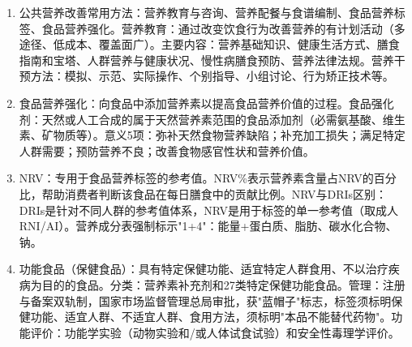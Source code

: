 {\begin{enumerate}[leftmargin=*, itemsep=5pt]
    \item 公共营养改善常用方法：营养教育与咨询、营养配餐与食谱编制、食品营养标签、食品营养强化。营养教育：通过改变饮食行为改善营养的有计划活动（多途径、低成本、覆盖面广）。主要内容：营养基础知识、健康生活方式、膳食指南和宝塔、人群营养与健康状况、慢性病膳食预防、营养法律法规。营养干预方法：模拟、示范、实际操作、个别指导、小组讨论、行为矫正技术等。

    \item 食品营养强化：向食品中添加营养素以提高食品营养价值的过程。食品强化剂：天然或人工合成的属于天然营养素范围的食品添加剂（必需氨基酸、维生素、矿物质等）。意义5项：弥补天然食物营养缺陷；补充加工损失；满足特定人群需要；预防营养不良；改善食物感官性状和营养价值。

    \item NRV：专用于食品营养标签的参考值。NRV\%表示营养素含量占NRV的百分比，帮助消费者判断该食品在每日膳食中的贡献比例。NRV与DRIs区别：DRIs是针对不同人群的参考值体系，NRV是用于标签的单一参考值（取成人RNI/AI）。营养成分表强制标示"1+4"：能量+蛋白质、脂肪、碳水化合物、钠。

    \item 功能食品（保健食品）：具有特定保健功能、适宜特定人群食用、不以治疗疾病为目的的食品。分类：营养素补充剂和27类特定保健功能食品。管理：注册与备案双轨制，国家市场监督管理总局审批，获"蓝帽子"标志，标签须标明保健功能、适宜人群、不适宜人群、食用方法，须标明"本品不能替代药物"。功能评价：功能学实验（动物实验和/或人体试食试验）和安全性毒理学评价。
\end{enumerate}

}
\newpage
